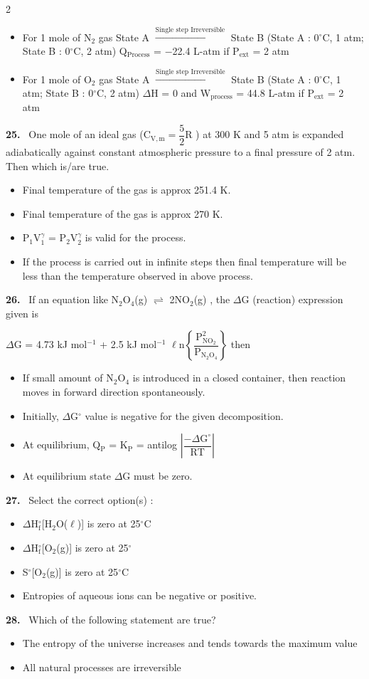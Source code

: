 \documentclass[10pt]{extarticle}
\newcommand{\qn}[1]{\par\smallskip\noindent\textbf{#1.}~}
\newenvironment{qoptions}{\begin{itemize}[leftmargin=1.8em,itemsep=1pt,topsep=2pt,label={}]}{\end{itemize}}
\newcommand{\opt}[2]{\item[(#1)] #2}
\begin{document}
\begin{multicols}{2}
\begin{qoptions}
\opt{C}{For 1 mole of N$_2$ gas State A $\xrightarrow{\text{Single step Irreversible}}$ State B (State A : 0$^\circ$C, 1 atm; State B : 0$^\circ$C, 2 atm) Q$_\mathrm{Process}$ = $-$22.4 L-atm if P$_\mathrm{ext}$ = 2 atm}
\opt{D}{For 1 mole of O$_2$ gas State A $\xrightarrow{\text{Single step Irreversible}}$ State B (State A : 0$^\circ$C, 1 atm; State B : 0$^\circ$C, 2 atm) $\Delta$H = 0 and W$_\mathrm{process}$ = 44.8 L-atm if P$_\mathrm{ext}$ = 2 atm}
\end{qoptions}
\qn{25} One mole of an ideal gas (C$_\mathrm{V,m}=\dfrac52$R ) at 300 K and 5 atm is expanded adiabatically against constant atmospheric pressure to a final pressure of 2 atm. Then which is/are true.
\begin{qoptions}
\opt{A}{Final temperature of the gas is approx 251.4 K.}
\opt{B}{Final temperature of the gas is approx 270 K.}
\opt{C}{P$_1$V$_1^\gamma$ = P$_2$V$_2^\gamma$ is valid for the process.}
\opt{D}{If the process is carried out in infinite steps then final temperature will be less than the temperature observed in above process.}
\end{qoptions}
\qn{26} If an equation like N$_2$O$_4$(g) $\rightleftharpoons$ 2NO$_2$(g) , the $\Delta$G (reaction) expression given is\par
$\Delta$G = 4.73 kJ mol$^{-1}$ + 2.5 kJ mol$^{-1}$ $\ell$n$\left\{\dfrac{\mathrm P_{\mathrm{NO}_2}^2}{\mathrm P_{\mathrm N_2\mathrm O_4}}\right\}$ then
\begin{qoptions}
\opt{A}{If small amount of N$_2$O$_4$ is introduced in a closed container, then reaction moves in forward direction spontaneously.}
\opt{B}{Initially, $\Delta$G$^\circ$ value is negative for the given decomposition.}
\opt{C}{At equilibrium, Q$_\mathrm P$ = K$_\mathrm P$ = antilog $\left|\dfrac{-\Delta\mathrm G^\circ}{\mathrm{RT}}\right|$}
\opt{D}{At equilibrium state $\Delta$G must be zero.}
\end{qoptions}
\qn{27} Select the correct option(s) :
\begin{qoptions}
\opt{A}{$\Delta$H$^\circ_\mathrm f$[H$_2$O($\ell$)] is zero at 25$^\circ$C}
\opt{B}{$\Delta$H$^\circ_\mathrm f$[O$_2$(g)] is zero at 25$^\circ$}
\opt{C}{S$^\circ$[O$_2$(g)] is zero at 25$^\circ$C}
\opt{D}{Entropies of aqueous ions can be negative or positive.}
\end{qoptions}
\qn{28} Which of the following statement are true?
\begin{qoptions}
\opt{A}{The entropy of the universe increases and tends towards the maximum value}
\opt{B}{All natural processes are irreversible}

\end{qoptions}
\end{multicols}
\end{document}
